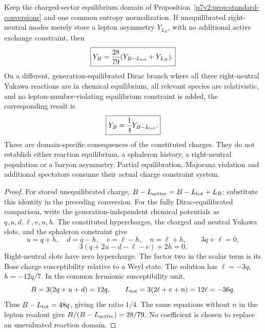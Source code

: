 \documentclass[12pt,a4paper]{article}
\begin{document}
\begin{proposition}
\label{p7:prop:v2211-right-neutral-spectator-domain}
Keep the charged-sector equilibrium domain of
Proposition~\ref{p7v2:prop:standard-conversions} and one common entropy
normalization.  If unequilibrated right-neutral modes merely store a
lepton asymmetry \(Y_{L_R}\), with no additional active exchange
constraint, then
\[
 \boxed{Y_B=\frac{28}{79}
 (Y_{B-L_{\rm tot}}+Y_{L_R}).}
\]
On a different, generation-equilibrated Dirac branch where all three
right-neutral Yukawa reactions are in chemical equilibrium, all relevant
species are relativistic, and no lepton-number-violating equilibrium
constraint is added, the corresponding result is
\[
 \boxed{Y_B=\frac14Y_{B-L_{\rm tot}}.}
\]
These are domain-specific consequences of the constituted charges.  They
do not establish either reaction equilibrium, a sphaleron history, a
right-neutral population or a baryon asymmetry.  Partial equilibration,
Majorana violation and additional spectators consume their actual charge
constraint system.
\end{proposition}
\begin{proof}
For stored unequilibrated charge,
\(B-L_{\rm active}=B-L_{\rm tot}+L_R\); substitute this identity in
the preceding conversion.  For the fully Dirac-equilibrated comparison,
write the generation-independent chemical potentials as
\(q,u,d,\ell,e,n,h\).  The constituted hypercharges, the charged and
neutral Yukawa slots, and the sphaleron constraint give
\[
 u=q+h,\quad d=q-h,\quad e=\ell-h,\quad n=\ell+h,
 \qquad 3q+\ell=0,
\]
\[
 3(q+2u-d-\ell-e)+2h=0.
\]
Right-neutral slots have zero hypercharge.  The factor two in the scalar
term is its Bose charge susceptibility relative to a Weyl state.  The
solution has \(\ell=-3q\), \(h=-12q/7\).  In the common fermionic
susceptibility unit,
\[
 B=3(2q+u+d)=12q,\qquad
 L_{\rm tot}=3(2\ell+e+n)=12\ell=-36q.
\]
Thus \(B-L_{\rm tot}=48q\), giving the ratio \(1/4\).
The same equations without \(n\) in the lepton readout give
\(B/(B-L_{\rm active})=28/79\).  No coefficient is chosen to replace
an unevaluated reaction domain.
\end{proof}
\end{document}
